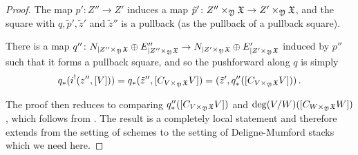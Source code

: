 \begin{proof}

The map $p'\colon Z'' \to Z'$ induces a map $\tilde{p}'\colon Z'' \times_{\frak Y} \frak X  \to Z' \times_{\frak Y} \frak X $, and the square with $q, \tilde{p}', \tilde{z}'$ and $\tilde{z}''$ is a pullback (as the pullback of a pullback square).

There is a map $q''\colon N_{\mid Z'' \times_{\frak Y} \frak X} \oplus E''_{\mid Z'' \times_{\frak Y} \frak X} \to  N_{\mid Z' \times_{\frak Y} \frak X} \oplus E'_{\mid Z' \times_{\frak Y} \frak X}$ induced by $p''$ such that it forms a pullback square, and so
 the pushforward along $q$ is simply
$$q_*(i^!(z'', [V])) = q_*(\tilde{z}'', [C_{V\times_{\frak Y} \frak X} V]) = (\tilde{z}', q''_*([C_{V\times_{\frak Y} \frak X} V]))\, . $$

The proof then reduces to comparing $q''_*([C_{V\times_{\frak Y} \frak X} V])$ and $\deg(V/W)([C_{W\times_{\frak Y} \frak X} W])$, which follows from \cite[Lemma 3.15]{Vistoli1989Intersection-th}. The result is a completely local statement and
therefore extends from the setting of schemes to the setting of Deligne-Mumford stacks which we need here. %
\end{proof}


